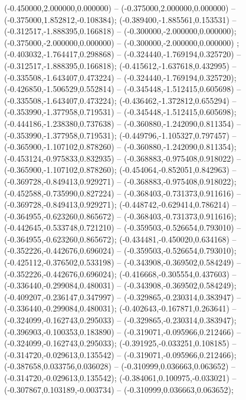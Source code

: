  (-0.450000,2.000000,0.000000) -- (-0.375000,2.000000,0.000000) -- (-0.375000,1.852812,-0.108384);
 (-0.389400,-1.885561,0.153531) -- (-0.312517,-1.888395,0.166818) -- (-0.300000,-2.000000,0.000000);
 (-0.375000,-2.000000,0.000000) -- (-0.300000,-2.000000,0.000000) ;
 (-0.403032,-1.764417,0.298868) -- (-0.324440,-1.769194,0.325720) -- (-0.312517,-1.888395,0.166818);
 (-0.415612,-1.637618,0.432995) -- (-0.335508,-1.643407,0.473224) -- (-0.324440,-1.769194,0.325720);
 (-0.426850,-1.506529,0.552814) -- (-0.345448,-1.512415,0.605698) -- (-0.335508,-1.643407,0.473224);
 (-0.436462,-1.372812,0.655294) -- (-0.353990,-1.377958,0.719531) -- (-0.345448,-1.512415,0.605698);
 (-0.444186,-1.238380,0.737638) -- (-0.360880,-1.242090,0.811354) -- (-0.353990,-1.377958,0.719531);
 (-0.449796,-1.105327,0.797457) -- (-0.365900,-1.107102,0.878260) -- (-0.360880,-1.242090,0.811354);
 (-0.453124,-0.975833,0.832935) -- (-0.368883,-0.975408,0.918022) -- (-0.365900,-1.107102,0.878260);
 (-0.454064,-0.852051,0.842963) -- (-0.369728,-0.849413,0.929271) -- (-0.368883,-0.975408,0.918022);
 (-0.452588,-0.735990,0.827224) -- (-0.368403,-0.731373,0.911616) -- (-0.369728,-0.849413,0.929271);
 (-0.448742,-0.629414,0.786214) -- (-0.364955,-0.623260,0.865672) -- (-0.368403,-0.731373,0.911616);
 (-0.442645,-0.533748,0.721210) -- (-0.359503,-0.526654,0.793010) -- (-0.364955,-0.623260,0.865672);
 (-0.434481,-0.450020,0.634168) -- (-0.352226,-0.442676,0.696024) -- (-0.359503,-0.526654,0.793010);
 (-0.425112,-0.376502,0.533198) -- (-0.343908,-0.369502,0.584249) -- (-0.352226,-0.442676,0.696024);
 (-0.416668,-0.305554,0.437603) -- (-0.336440,-0.299084,0.480031) -- (-0.343908,-0.369502,0.584249);
 (-0.409207,-0.236147,0.347997) -- (-0.329865,-0.230314,0.383947) -- (-0.336440,-0.299084,0.480031);
 (-0.402643,-0.167871,0.263641) -- (-0.324099,-0.162743,0.295033) -- (-0.329865,-0.230314,0.383947);
 (-0.396903,-0.100353,0.183890) -- (-0.319071,-0.095966,0.212466) -- (-0.324099,-0.162743,0.295033);
 (-0.391925,-0.033251,0.108185) -- (-0.314720,-0.029613,0.135542) -- (-0.319071,-0.095966,0.212466);
 (-0.387658,0.033756,0.036028) -- (-0.310999,0.036663,0.063652) -- (-0.314720,-0.029613,0.135542);
 (-0.384061,0.100975,-0.033021) -- (-0.307867,0.103189,-0.003734) -- (-0.310999,0.036663,0.063652);
